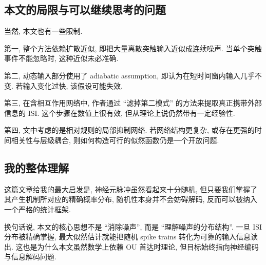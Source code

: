 \documentclass[oneside]{ctexart}
\begin{document}
\subsection{本文的局限与可以继续思考的问题}

当然, 本文也有一些限制.

第一, 整个方法依赖扩散近似, 即把大量离散突触输入近似成连续噪声. 当单个突触事件不能忽略时, 这种近似未必准确.

第二, 动态输入部分使用了 adiabatic assumption, 即认为在短时间窗内输入几乎不变. 若输入变化过快, 该假设可能失效.

第三, 在含相互作用网络中, 作者通过 ``滤掉第二模式'' 的方法来提取真正携带外部信息的 ISI. 这个步骤在数值上很有效, 但从理论上说仍然带有一定经验性.

第四, 文中考虑的是相对规则的局部抑制网络. 若网络结构更复杂, 或存在更强的时间相关性与层级耦合, 则如何构造可行的似然函数仍是一个开放问题.

\subsection{我的整体理解}

这篇文章给我的最大启发是, 神经元脉冲虽然看起来十分随机, 但只要我们掌握了其产生机制所对应的精确概率分布, 随机性本身并不会妨碍解码, 反而可以被纳入一个严格的统计框架.

换句话说, 本文的核心思想不是 ``消除噪声'', 而是 ``理解噪声的分布结构''. 一旦 ISI 分布被精确掌握, 最大似然估计就能把随机 spike trains 转化为可靠的输入信息读出. 这也是为什么本文虽然数学上依赖 OU 首达时理论, 但目标始终指向神经编码与信息解码问题.
\end{document}
